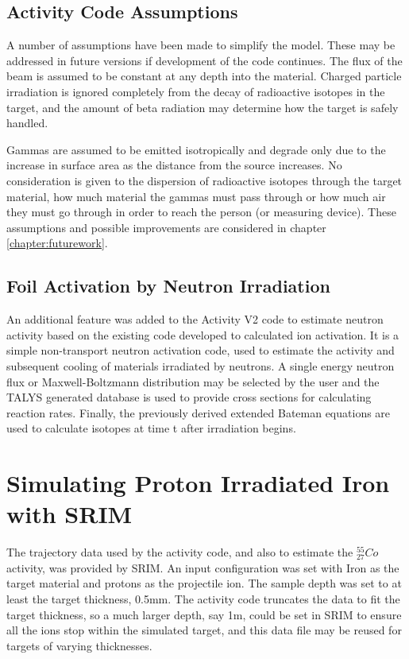 \subsection{Activity Code Assumptions}

A number of assumptions have been made to simplify the model.  These may be addressed in future versions if development of the code continues.  The flux of the beam is assumed to be constant at any depth into the material.  Charged particle irradiation is ignored completely from the decay of radioactive isotopes in the target, and the amount of beta radiation may determine how the target is safely handled.

Gammas are assumed to be emitted isotropically and degrade only due to the increase in surface area as the distance from the source increases.  No consideration is given to the dispersion of radioactive isotopes through the target material, how much material the gammas must pass through or how much air they must go through in order to reach the person (or measuring device).  These assumptions and possible improvements are considered in chapter \ref{chapter:futurework}.


\FloatBarrier



\subsection{Foil Activation by Neutron Irradiation}

An additional feature was added to the Activity V2 code to estimate neutron activity based on the existing code developed to calculated ion activation.  It is a simple non-transport neutron activation code, used to estimate the activity and subsequent cooling of materials irradiated by neutrons.  A single energy neutron flux or Maxwell-Boltzmann distribution may be selected by the user and the TALYS generated database is used to provide cross sections for calculating reaction rates.  Finally, the previously derived extended Bateman equations are used to calculate isotopes at time t after irradiation begins.


\FloatBarrier
\section[Simulating with SRIM - Iron]{Simulating Proton Irradiated Iron with SRIM}

The trajectory data used by the activity code, and also to estimate the ${}^{55}_{27} Co$ activity, was provided by SRIM.  An input configuration was set with Iron as the target material and protons as the projectile ion.  The sample depth was set to at least the target thickness, 0.5mm.  The activity code truncates the data to fit the target thickness, so a much larger depth, say 1m, could be set in SRIM to ensure all the ions stop within the simulated target, and this data file may be reused for targets of varying thicknesses.

